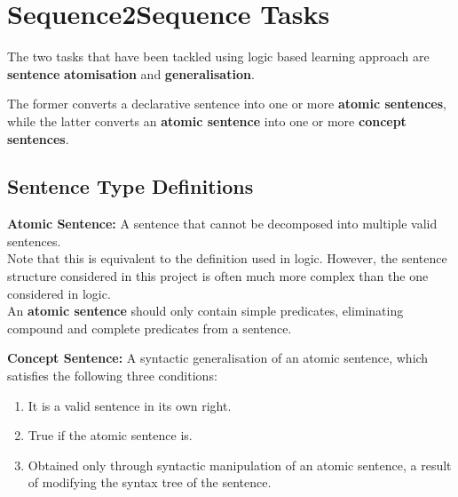 
 
\section{Sequence2Sequence Tasks}

The two tasks that have been tackled using logic based learning approach are \textbf{sentence} \textbf{atomisation} and \textbf{generalisation}.

The former converts a declarative sentence into one or more \textbf{atomic sentences}, while the latter converts an \textbf{atomic sentence} into one or more \textbf{concept sentences}.

\subsection{Sentence Type Definitions}
\label{sentence-type-definitions}

\textbf{Atomic Sentence:} A sentence that cannot be decomposed into multiple valid sentences. \\
Note that this is equivalent to the definition used in logic.
However, the sentence structure considered in this project is often much more complex than the one considered in logic.\\
An \textbf{atomic sentence} should only contain simple predicates, eliminating compound and complete predicates from a sentence.


\textbf{Concept Sentence:} A syntactic generalisation of an atomic sentence, which satisfies the following three conditions:
\begin{enumerate}
    \item It is a valid sentence in its own right.
    \item True if the atomic sentence is.
    \item Obtained only through syntactic manipulation of an atomic sentence, a result of modifying the syntax tree of the sentence.
\end{enumerate}

